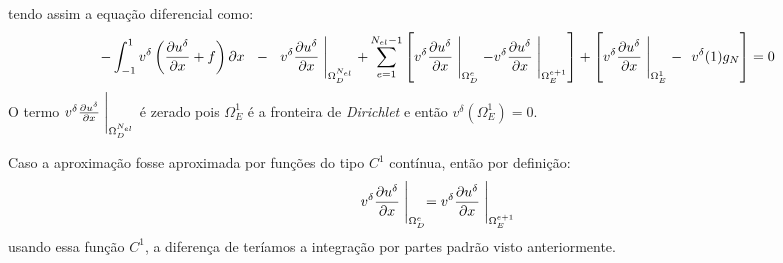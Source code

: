 tendo assim a equação diferencial como:
\begin{align}
-\int^1_{-1} v^\delta\left (\frac{\partial u^\delta}{\partial x} + f  \right ) \partial x \ \
 -\ \   v^\delta \frac{\partial u^\delta}{\partial x}\Biggm\lvert_{\Omega^{N_{el}}_D}
+\sum^{{N_{el} -1}}_{e=1} \left [ v^\delta \frac{\partial u^\delta}{\partial x}\Biggm\lvert_{\Omega^e_D} -  v^\delta \frac{\partial u^\delta}{\partial x}\Biggm\lvert_{\Omega^{e+ 1}_E}    \right ] 
+  \left [  v^\delta \frac{\partial u^\delta}{\partial x}\Biggm\lvert_{\Omega^{1}_E}  -\ \ v^\delta(1)g_N \right ] = 0 
\end{align}
 O termo $ v^\delta \frac{\partial u^\delta}{\partial x}\Biggm\lvert_{\Omega^{N_{el}}_D}$ é zerado pois $\Omega^1_E$ é a fronteira de \emph{Dirichlet} e então $v^\delta(\Omega^1_E)=0$.

 Caso a aproximação fosse aproximada por funções do tipo $C^1$ contínua, então por definição:
 \begin{equation}
  v^\delta\frac{\partial u^\delta}{\partial x} \Biggm\lvert_{\Omega^e_D} =  v^\delta\frac{\partial u^\delta}{\partial x} \Biggm\lvert_{\Omega^{e+1}_E} 
 \end{equation}
 usando essa função $C^1$, a diferença de  teríamos a integração por partes padrão visto anteriormente.
